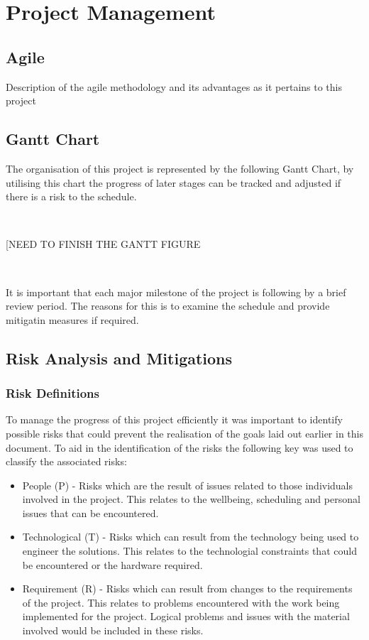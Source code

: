 \documentclass[12pt]{article}  %
\theoremstyle{definition}
\theoremstyle{remark}
\begin{document}
\section{Project Management}\label{ss:back}

\subsection {Agile}

Description of the agile methodology and its advantages as it pertains to this project

\subsection {Gantt Chart}

The organisation of this project is represented by the following Gantt Chart, by utilising this chart the progress of later stages can be tracked and adjusted if there is a risk to the schedule.

\

[NEED TO FINISH THE GANTT FIGURE

\

It is important that each major milestone of the project is following by a brief review period. The reasons for this is to examine the schedule and provide mitigatin measures if required.

\subsection {Risk Analysis and Mitigations}

\subsubsection {Risk Definitions}
To manage the progress of this project efficiently it was important to identify possible risks that could prevent the realisation of the goals laid out earlier in this document. To aid in the identification of the risks the following key was used to classify the associated risks:
\begin{itemize}
\item{People (P) - Risks which are the result of issues related to those individuals involved in the project. This relates to the wellbeing, scheduling and personal issues that can be encountered.}
\item{Technological (T) - Risks which can result from the technology being used to engineer the solutions. This relates to the technologial constraints that could be encountered or the hardware required.}
\item{Requirement (R)  - Risks which can result from changes to the requirements of the project. This relates to problems encountered with the work being implemented for the project. Logical problems and issues with the material involved would be included in these risks.}
\end{itemize}
\end{document}
